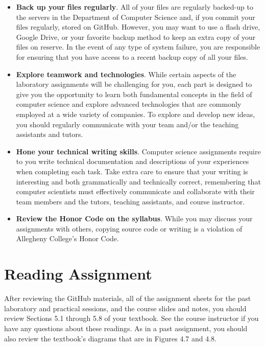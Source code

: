\documentclass[11pt]{article}
\begin{document}
\begin{itemize}
\item {\bf Back up your files regularly}. All of your files are regularly backed-up to the servers in the Department of
  Computer Science and, if you commit your files regularly, stored on GitHub. However, you may want to use a flash
  drive, Google Drive, or your favorite backup method to keep an extra copy of your files on reserve. In the event of
  any type of system failure, you are responsible for ensuring that you have access to a recent backup copy of all your
  files.

\item {\bf Explore teamwork and technologies}. While certain aspects of the laboratory assignments will be challenging
  for you, each part is designed to give you the opportunity to learn both fundamental concepts in the field of computer
  science and explore advanced technologies that are commonly employed at a wide variety of companies. To explore and
  develop new ideas, you should regularly communicate with your team and/or the teaching assistants and tutors.

\item {\bf Hone your technical writing skills}. Computer science assignments require to you write technical
  documentation and descriptions of your experiences when completing each task. Take extra care to ensure that your
  writing is interesting and both grammatically and technically correct, remembering that computer scientists must
  effectively communicate and collaborate with their team members and the tutors, teaching assistants, and course
  instructor.

\item {\bf Review the Honor Code on the syllabus}. While you may discuss your assignments with others, copying source
  code or writing is a violation of Allegheny College's Honor Code.

\end{itemize}

\section*{Reading Assignment}

After reviewing the GitHub materials, all of the assignment sheets for the past laboratory and practical sessions, and
the course slides and notes, you should review Sections 5.1 through 5.8 of your textbook. See the course instructor if
you have any questions about these readings. As in a past assignment, you should also review the textbook's diagrams
that are in Figures 4.7 and 4.8.
\end{document}
